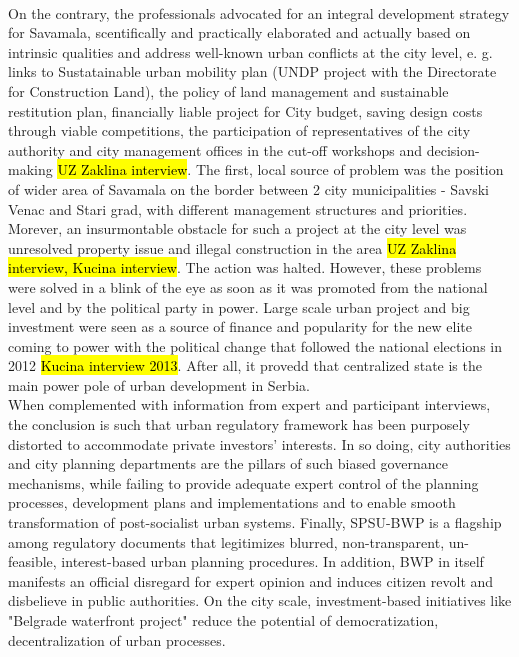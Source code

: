 \documentclass[11pt]{report}
\begin{document}
\\
On the contrary, the professionals advocated for an integral development strategy for Savamala, scentifically and practically elaborated and actually based on intrinsic qualities and address well-known urban conflicts at the city level, e. g.
links to Sustatainable urban mobility plan (UNDP project with the Directorate for Construction Land),  the policy of land management and sustainable restitution plan, financially liable project for City budget, saving design costs through viable competitions, the participation of representatives of the city authority and city management offices in the cut-off workshops and decision-making
\hl{UZ Zaklina interview}.
The first, local source of problem was the position of wider area of Savamala on the border between 2 city municipalities - Savski Venac and Stari grad, with different management structures and priorities. Morever, an insurmontable obstacle for such a project at the city level was unresolved property issue and illegal construction in the area \hl{UZ Zaklina interview, Kucina interview}. The action was halted.
However, these problems were solved in a blink of the eye as soon as it was promoted from the national level and by the political party in power. Large scale urban project and big investment were seen as a source of finance and popularity for the new elite coming to power with the political change that followed the national elections in 2012 \hl{Kucina interview 2013}. After all, it provedd that centralized state is the main power pole of urban development in Serbia.
\\
When complemented with information from expert and participant interviews, the conclusion is such that urban regulatory framework has been purposely distorted to accommodate private investors’ interests.
In so doing, city authorities and city planning departments are the pillars of such biased governance mechanisms, while failing to provide adequate expert control of the planning processes, development plans and implementations and to enable smooth transformation of post-socialist urban systems.
Finally, SPSU-BWP is a flagship among regulatory documents that legitimizes blurred, non-transparent, un-feasible, interest-based urban planning procedures. In addition, BWP in itself manifests an official disregard for expert opinion and induces citizen revolt and disbelieve in public authorities. On the city scale, investment-based initiatives like "Belgrade waterfront project" reduce the potential of democratization, decentralization of urban processes.
\\
\end{document}

